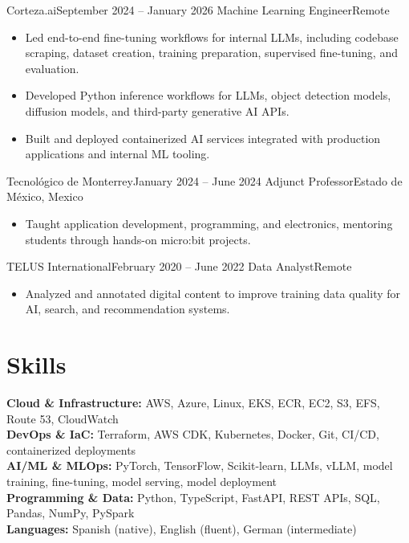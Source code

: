\documentclass[10pt,letterpaper]{article}
\begin{document}
\entry
{Corteza.ai}{September 2024 -- January 2026}
{Machine Learning Engineer}{Remote}
\begin{itemize}
  \item Led end-to-end fine-tuning workflows for internal LLMs, including codebase scraping, dataset creation, training preparation, supervised fine-tuning, and evaluation.
  \item Developed Python inference workflows for LLMs, object detection models, diffusion models, and third-party generative AI APIs.
  \item Built and deployed containerized AI services integrated with production applications and internal ML tooling.
\end{itemize}

\entry
{Tecnológico de Monterrey}{January 2024 -- June 2024}
{Adjunct Professor}{Estado de México, Mexico}
\begin{itemize}
  \item Taught application development, programming, and electronics, mentoring students through hands-on micro:bit projects.
\end{itemize}

\entry
{TELUS International}{February 2020 -- June 2022}
{Data Analyst}{Remote}
\begin{itemize}
  \item Analyzed and annotated digital content to improve training data quality for AI, search, and recommendation systems.
\end{itemize}

\section*{Skills}
\textbf{Cloud \& Infrastructure:} AWS, Azure, Linux, EKS, ECR, EC2, S3, EFS, Route 53, CloudWatch \\
\textbf{DevOps \& IaC:} Terraform, AWS CDK, Kubernetes, Docker, Git, CI/CD, containerized deployments \\
\textbf{AI/ML \& MLOps:} PyTorch, TensorFlow, Scikit-learn, LLMs, vLLM, model training, fine-tuning, model serving, model deployment \\
\textbf{Programming \& Data:} Python, TypeScript, FastAPI, REST APIs, SQL, Pandas, NumPy, PySpark \\
\textbf{Languages:} Spanish (native), English (fluent), German (intermediate)

\end{document}

